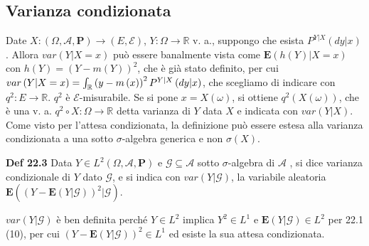 \documentclass{article}
\begin{document}
\subsection{Varianza condizionata}

Date $X:\left( \Omega ,\mathcal{A},\mathbf{P}\right) \rightarrow \left( E,%
\mathcal{E}\right) $, $Y:\Omega \rightarrow 
\mathbb{R}
$ v. a., suppongo che esista $P^{Y|X}\left( dy|x\right) $. Allora $%
var\left( Y|X=x\right) $ pu\`{o} essere banalmente vista come $\mathbf{E}%
\left( h\left( Y\right) |X=x\right) $ con $h\left( Y\right) =\left(
Y-m\left( Y\right) \right) ^{2}$, che \`{e} gi\`{a} stato definito, per cui $%
var\left( Y|X=x\right) =\int_{%
\mathbb{R}
}\left( y-m\left( x\right) \right) ^{2}P^{Y|X}\left( dy|x\right) $, che
scegliamo di indicare con $q^{2}:E\rightarrow 
\mathbb{R}
$. $q^{2}$ \`{e} $\mathcal{E}$-misurabile. Se si pone $x=X\left( \omega
\right) $, si ottiene $q^{2}\left( X\left( \omega \right) \right) $, che 
\`{e} una v. a. $q^{2}\circ X:\Omega \rightarrow 
\mathbb{R}
$ detta varianza di $Y$ data $X$ e indicata con $var\left( Y|X\right) $.
Come visto per l'attesa condizionata, la definizione pu\`{o} essere estesa
alla varianza condizionata a una sotto $\sigma $-algebra generica e non $%
\sigma \left( X\right) $.

\textbf{Def 22.3} Data $Y\in L^{2}\left( \Omega ,\mathcal{A},\mathbf{P}%
\right) $ e $\mathcal{G\subseteq A}$ sotto $\sigma $-algebra di $\mathcal{A}$%
, si dice varianza condizionale di $Y$ dato $\mathcal{G}$, e si indica con $%
var\left( Y|\mathcal{G}\right) $, la variabile aleatoria $\mathbf{E}\left(
\left( Y-\mathbf{E}\left( Y|\mathcal{G}\right) \right) ^{2}|\mathcal{G}%
\right) $.

$var\left( Y|\mathcal{G}\right) $ \`{e} ben definita perch\'{e} $Y\in L^{2}$
implica $Y^{2}\in L^{1}$ e $\mathbf{E}\left( Y|\mathcal{G}\right) \in L^{2}$
per 22.1 (10), per cui $\left( Y-\mathbf{E}\left( Y|\mathcal{G}\right)
\right) ^{2}\in L^{1}$ ed esiste la sua attesa condizionata.
\end{document}

